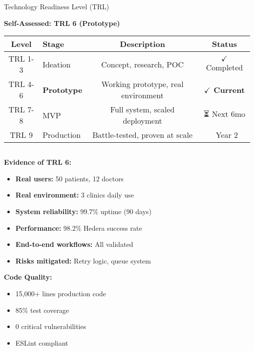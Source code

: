 \documentclass[aspectratio=169,xcolor=dvipsnames,20pt]{beamer}
\newcommand{\checkitem}{\item[\color{SuccessGreen}\faCheckCircle]}
\begin{document}
\begin{frame}{Technology Readiness Level (TRL)}

  \textbf{\textcolor{HederaPurple}{Self-Assessed: TRL 6 (Prototype)}}

  \begin{table}
    \small
    \begin{tabular}{clcc}
      \toprule
      \textbf{Level} & \textbf{Stage} & \textbf{Description} & \textbf{Status} \\
      \midrule
      TRL 1-3 & Ideation & Concept, research, POC & \textcolor{SuccessGreen}{$\checkmark$ Completed} \\
      TRL 4-6 & \textbf{Prototype} & Working prototype, real environment & \textcolor{SuccessGreen}{\textbf{$\checkmark$ Current}} \\
      TRL 7-8 & MVP & Full system, scaled deployment & \textcolor{WarningOrange}{⏳ Next 6mo} \\
      TRL 9 & Production & Battle-tested, proven at scale & \textcolor{FadjmaBlue}{🎯 Year 2} \\
      \bottomrule
    \end{tabular}
  \end{table}

  \vspace{0.3cm}

  \begin{columns}[T]
    \begin{column}{0.5\textwidth}
      \textbf{Evidence of TRL 6:}

      \begin{itemize}
        \checkitem \textbf{Real users:} 50 patients, 12 doctors
        \checkitem \textbf{Real environment:} 3 clinics daily use
        \checkitem \textbf{System reliability:} 99.7\% uptime (90 days)
        \checkitem \textbf{Performance:} 98.2\% Hedera success rate
        \checkitem \textbf{End-to-end workflows:} All validated
        \checkitem \textbf{Risks mitigated:} Retry logic, queue system
      \end{itemize}

      \vspace{0.2cm}

      \textbf{Code Quality:}
      \begin{itemize}
        \item 15,000+ lines production code
        \item 85\% test coverage
        \item 0 critical vulnerabilities
        \item ESLint compliant
      \end{itemize}
    \end{column}


\end{columns}
\end{frame}
\end{document}
